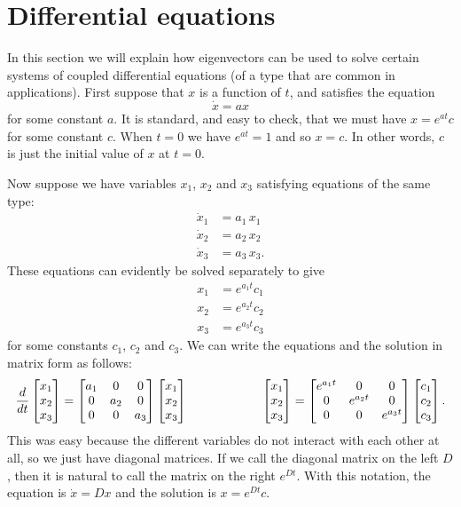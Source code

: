\documentclass[reqno]{amsart}
\theoremstyle{definition}
\begin{document}
\section{Differential equations}
\label{sec-ode}

In this section we will explain how eigenvectors can be used to solve
certain systems of coupled differential equations (of a type that are
common in applications).  First suppose that $x$ is a function of $t$,
and satisfies the equation 
\[ \dot{x} = ax \]
for some constant $a$.  It is standard, and easy to check, that we
must have $x=e^{at}c$ for some constant $c$.  When $t=0$ we have
$e^{at}=1$ and so $x=c$.  In other words, $c$ is just the initial
value of $x$ at $t=0$.

Now suppose we have variables $x_1$, $x_2$ and $x_3$ satisfying
equations of the same type:
\begin{align*}
 \dot{x}_1 &= a_1\,x_1 \\
 \dot{x}_2 &= a_2\,x_2 \\
 \dot{x}_3 &= a_3\,x_3.
\end{align*}
These equations can evidently be solved separately to give
\begin{align*}
 x_1 &= e^{a_1t} c_1 \\
 x_2 &= e^{a_2t} c_2 \\
 x_3 &= e^{a_3t} c_3
\end{align*}
for some constants $c_1$, $c_2$ and $c_3$.  We can write the equations
and the solution in matrix form as follows:
\begin{align*}
 \frac{d}{dt}\left[\begin{matrix} x_1 \\ x_2 \\ x_3 \end{matrix}\right] 
  = \left[\begin{matrix} a_1 & 0 & 0 \\ 0 & a_2 & 0 \\ 0 & 0 & a_3 \end{matrix}\right]
    \left[\begin{matrix} x_1 \\ x_2 \\ x_3 \end{matrix}\right] \hspace{6em}
    \left[\begin{matrix} x_1 \\ x_2 \\ x_3 \end{matrix}\right] =
    \left[\begin{matrix} e^{a_1t} & 0 & 0 \\ 0 & e^{a_2t} & 0 \\ 0 & 0 & e^{a_3t} \end{matrix}\right]
    \left[\begin{matrix} c_1 \\ c_2 \\ c_3 \end{matrix}\right].
\end{align*}
This was easy because the different variables do not interact with
each other at all, so we just have diagonal matrices.  
If we call the diagonal matrix on the left $D$, then it is natural to
call the matrix on the right $e^{Dt}$.  With this notation, the
equation is $\dot{x}=Dx$ and the solution is $x=e^{Dt}c$.
\end{document}
